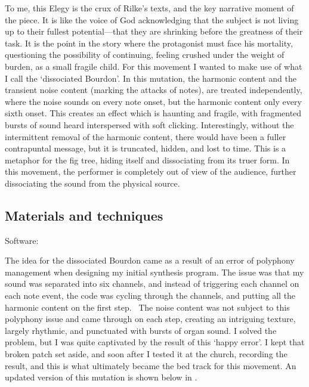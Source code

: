 \documentclass[12pt,twoside,maitrise]{dms_ks}
\theoremstyle{definition}
\begin{document}
{{To me, this Elegy is the crux of Rilke's texts, and the key narrative moment of the piece.
It is like the voice of God acknowledging that the subject is not living up to their fullest potential---that they are shrinking before the greatness of their task.
It is the point in the story where the protagonist must face his mortality, questioning the possibility of continuing, feeling crushed under the weight of burden, as a small fragile child.
For this movement I wanted to make use of what I call the `dissociated Bourdon'.
In this mutation, the harmonic content and the transient noise content (marking the attacks of notes), are treated independently, where the noise sounds on every note onset, but the harmonic content only every sixth onset.
This creates an effect which is haunting and fragile, with fragmented bursts of sound heard interspersed with soft clicking.
Interestingly, without the intermittent removal of the harmonic content, there would have been a fuller contrapuntal message, but it is truncated, hidden, and lost to time.
This is a metaphor for the fig tree, hiding itself and dissociating from its truer form.
In this movement, the performer is completely out of view of the audience, further dissociating the sound from the physical source.

\subsection{Materials and techniques}

Software:

The idea for the dissociated Bourdon came as a result of an error of polyphony management when designing my initial synthesis program.
The issue was that my sound was separated into six channels, and instead of triggering each channel on each note event, the code was cycling through the channels, and putting all the harmonic content on the first step.~
The noise content was not subject to this polyphony issue and came through on each step, creating an intriguing texture, largely rhythmic, and punctuated with bursts of organ sound.
I solved the problem, but I was quite captivated by the result of this `happy error'.
I kept that broken patch set aside, and soon after I tested it at the church, recording the result, and this is what ultimately became the bed track for this movement.
An updated version of this mutation is shown below in .

}}
\end{document}
